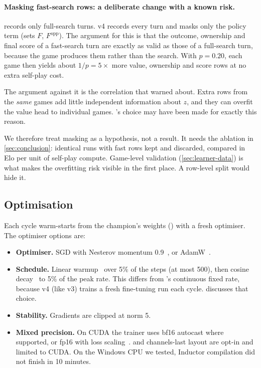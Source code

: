\paragraph{Masking fast-search rows: a deliberate change with a known risk.}
\katago{} records only full-search turns. v4 records every turn and masks only the policy
term (sets $F$, $F^{\mathrm{opp}}$). The argument for this is that the outcome, ownership
and final score of a fast-search turn are exactly as valid as those of a full-search turn,
because the game produces them rather than the search. With $p=0.20$, each game then
yields about $1/p = 5\times$ more value, ownership and score rows at no extra self-play
cost.

The argument against it is the correlation that \citet{silver2016mastering} warned about.
Extra rows from the \emph{same} games add little independent information about $z$, and
they can overfit the value head to individual games. \katago{}'s choice may have been made
for exactly this reason.

We therefore treat masking as a hypothesis, not a result. It needs the ablation in
\cref{sec:conclusion}: identical runs with fast rows kept and discarded, compared in Elo
per unit of self-play compute. Game-level validation (\cref{sec:learner-data}) is what
makes the overfitting risk visible in the first place. A row-level split would hide it.

\subsection{Optimisation}\label{sec:learner-opt}

Each cycle warm-starts from the champion's weights () with a fresh
optimiser. The optimiser options are:
\begin{itemize}
  \item \textbf{Optimiser.} SGD with Nesterov momentum 0.9~\citep{sutskever2013importance}, or
        AdamW~\citep{loshchilov2019decoupled}.
  \item \textbf{Schedule.} Linear warmup~\citep{goyal2017accurate} over 5\% of the steps (at
        most 500), then cosine decay~\citep{loshchilov2017sgdr} to 5\% of the peak rate.
        This differs from \katago{}'s continuous fixed rate, because v4 (like v3) trains a
        fresh fine-tuning run each cycle.  discusses that choice.
  \item \textbf{Stability.} Gradients are clipped at norm 5.
  \item \textbf{Mixed precision.} On CUDA the trainer uses bf16 autocast where supported, or
        fp16 with loss scaling~\citep{micikevicius2018mixed}.  and
        channels-last layout are opt-in and limited to CUDA. On the Windows CPU we tested,
        Inductor compilation did not finish in 10 minutes.
\end{itemize}

